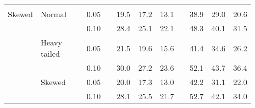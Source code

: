 \begin{table}[ht]
\begin{scriptsize}
\begin{center}
\begin{tabular}{ll p{.1cm} c p{.1cm} rrr p{.1cm} rrr}
&&&&&&&&&&&\\
Skewed       & Normal       && 0.05 &&   19.5 & 17.2 & 13.1 &   & 38.9 & 29.0 & 20.6 \\ 
             &              && 0.10 &&   28.4 & 25.1 & 22.1 &   & 48.3 & 40.1 & 31.5 \\ 
             & Heavy tailed && 0.05 &&   21.5 & 19.6 & 15.6 &   & 41.4 & 34.6 & 26.2 \\ 
             &              && 0.10 &&   30.0 & 27.2 & 23.6 &   & 52.1 & 43.7 & 36.4 \\ 
             & Skewed       && 0.05 &&   20.0 & 17.3 & 13.0 &   & 42.2 & 31.1 & 22.0 \\ 
             &              && 0.10 &&   28.1 & 25.5 & 21.7 &   & 52.7 & 42.1 & 34.0 \\ 


\end{tabular}
\end{center}
\end{scriptsize}
\end{table}
